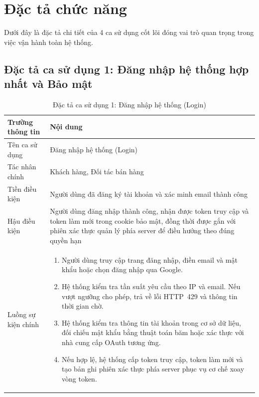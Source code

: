 \documentclass[../DoAn.tex]{subfiles}
\begin{document}
\section{Đặc tả chức năng}
\label{section:2.3}
Dưới đây là đặc tả chi tiết của 4 ca sử dụng cốt lõi đóng vai trò quan trọng trong việc vận hành toàn hệ thống.

\subsection{Đặc tả ca sử dụng 1: Đăng nhập hệ thống hợp nhất và Bảo mật}

\begin{table}[H]
\centering
\caption{Đặc tả ca sử dụng 1: Đăng nhập hệ thống (Login)}
\label{table:uc1_login}
\renewcommand{\arraystretch}{1.4}
\begin{tabular}{|>{\columncolor{blue!6}\raggedright\arraybackslash}p{3.5cm}|>{\raggedright\arraybackslash}p{10.5cm}|}
\hline
\rowcolor{blue!18}
\textbf{Trường thông tin} & \textbf{Nội dung} \\
\hline
Tên ca sử dụng & Đăng nhập hệ thống (Login) \\
\hline
Tác nhân chính & Khách hàng, Đối tác bán hàng \\
\hline
Tiền điều kiện & Người dùng đã đăng ký tài khoản và xác minh email thành công \\
\hline
Hậu điều kiện & Người dùng đăng nhập thành công, nhận được token truy cập và token làm mới trong cookie bảo mật, đồng thời được gắn với phiên xác thực quản lý phía server để điều hướng theo đúng quyền hạn \\
\hline
Luồng sự kiện chính &
\begin{minipage}[t]{10.3cm}
\vspace{3pt}
\begin{enumerate}[leftmargin=1.5em, topsep=0pt, parsep=0pt, itemsep=2pt, partopsep=0pt]
    \item Người dùng truy cập trang đăng nhập, điền email và mật khẩu hoặc chọn đăng nhập qua Google.
    \item Hệ thống kiểm tra tần suất yêu cầu theo IP và email. Nếu vượt ngưỡng cho phép, trả về lỗi HTTP~429 và thông tin thời gian chờ.
    \item Hệ thống kiểm tra thông tin tài khoản trong cơ sở dữ liệu, đối chiếu mật khẩu bằng thuật toán băm hoặc xác thực với nhà cung cấp OAuth tương ứng.
    \item Nếu hợp lệ, hệ thống cấp token truy cập, token làm mới và tạo bản ghi phiên xác thực phía server phục vụ cơ chế xoay vòng token.

\end{enumerate}
\end{minipage}
\end{tabular}
\end{table}
\end{document}
